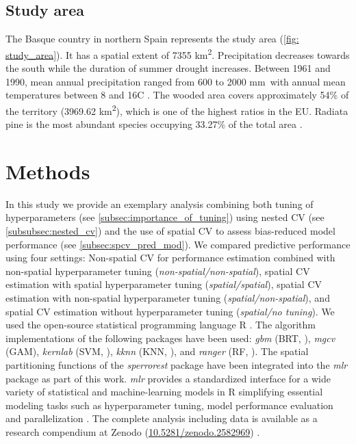 \documentclass[review]{elsarticle}
\begin{document}
\subsection{Study area}

The Basque country in northern Spain represents the study area (\autoref{fig: study_area}).
It has a spatial extent of 7355 km\textsuperscript{2}.
Precipitation decreases towards the south while the duration of summer drought increases.
Between 1961 and 1990, mean annual precipitation ranged from 600 to 2000 mm\, with annual mean temperatures between 8 and 16\degree C \citep{Ganuza2003}.
The wooded area covers approximately 54\% of the territory (3969.62 km\textsuperscript{2}), which is one of the highest ratios in the EU.
Radiata pine is the most abundant species occupying 33.27\% of the total area \citep{Mugica2016}.

\section{Methods}

\noindent In this study we provide an exemplary analysis combining both tuning of hyperparameters (see \autoref{subsec:importance_of_tuning}) using nested \ac{CV} (see \autoref{subsubsec:nested_cv}) and the use of spatial \ac{CV} to assess bias-reduced model performance (see \autoref{subsec:spcv_pred_mod}).
We compared predictive performance using four settings: Non-spatial \ac{CV} for performance estimation combined with non-spatial hyperparameter tuning (\emph{non-spatial/non-spatial}), spatial \ac{CV} estimation with spatial hyperparameter tuning (\emph{spatial/spatial}), spatial \ac{CV} estimation with non-spatial hyperparameter tuning (\emph{spatial/non-spatial}), and spatial \ac{CV} estimation without hyperparameter tuning (\emph{spatial/no tuning}).
We used the open-source statistical programming language R \citep{R_core}.
The algorithm implementations of the following packages have been used: \textit{gbm} \citep{gbm} (\ac{BRT}, \cite{Elith2008}), \textit{mgcv} \citep{mgcv} (\ac{GAM}), \textit{kernlab} \citep{kernlab} (\ac{SVM}, \cite{Vapnik1998}), \textit{kknn} \citep{kknn} (\ac{KNN}, \cite{Dudani1976}), and \textit{ranger} \citep{ranger} (\ac{RF}, \cite{Breiman2001}). 
The spatial partitioning functions of the \textit{sperrorest} package have been integrated into the \textit{mlr} package as part of this work.
\textit{mlr} provides a standardized interface for a wide variety of statistical and machine-learning models in R simplifying essential modeling tasks such as hyperparameter tuning, model performance evaluation and parallelization \citep{bischlMlrMachineLearning2016}. 
The complete analysis including data is available as a research compendium at Zenodo (\url{10.5281/zenodo.2582969})  \citep{schratz_patrick_2019_2591746}.	
\end{document}
